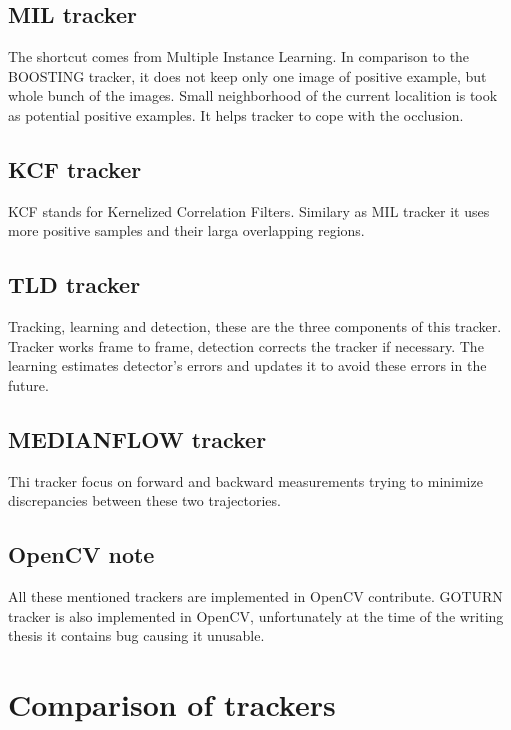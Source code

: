 
\subsection{MIL tracker}
The shortcut comes from Multiple Instance Learning. In comparison to the
BOOSTING tracker, it does not keep only one image of positive example, but
whole bunch of the images. Small neighborhood of the current localition is took
as potential positive examples. It helps tracker to cope with the occlusion.

\subsection{KCF tracker}
KCF stands for Kernelized Correlation Filters. Similary as MIL tracker it uses
more positive samples and their larga overlapping regions. 

\subsection{TLD tracker}
Tracking, learning and detection, these are the three components of this
tracker. Tracker works frame to frame, detection corrects the tracker if
necessary. The learning estimates detector's errors and updates it to avoid
these errors in the future.

\subsection{MEDIANFLOW tracker}
Thi tracker focus on forward and backward measurements trying to minimize
discrepancies between these two trajectories.

\subsection{OpenCV note}
All these mentioned trackers are implemented in OpenCV contribute. GOTURN
tracker is also implemented in OpenCV, unfortunately at the time of the writing
thesis it contains bug causing it unusable.


\section{Comparison of trackers}

